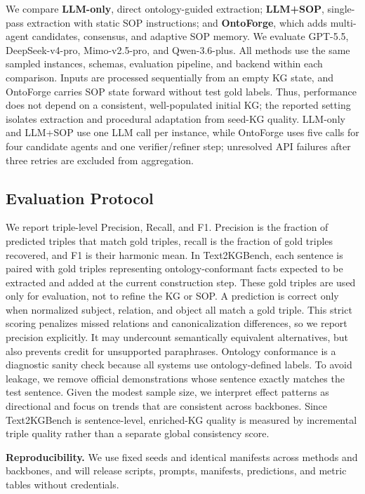 \documentclass[sigconf]{acmart}
\begin{document}
We compare \textbf{LLM-only}, direct ontology-guided extraction; \textbf{LLM+SOP}, single-pass extraction with static SOP instructions; and \textbf{OntoForge}, which adds multi-agent candidates, consensus, and adaptive SOP memory. We evaluate GPT-5.5, DeepSeek-v4-pro, Mimo-v2.5-pro, and Qwen-3.6-plus. All methods use the same sampled instances, schemas, evaluation pipeline, and backend within each comparison. Inputs are processed sequentially from an empty KG state, and OntoForge carries SOP state forward without test gold labels. Thus, performance does not depend on a consistent, well-populated initial KG; the reported setting isolates extraction and procedural adaptation from seed-KG quality. LLM-only and LLM+SOP use one LLM call per instance, while OntoForge uses five calls for four candidate agents and one verifier/refiner step; unresolved API failures after three retries are excluded from aggregation.

\subsection{Evaluation Protocol}

We report triple-level Precision, Recall, and F1. Precision is the fraction of predicted triples that match gold triples, recall is the fraction of gold triples recovered, and F1 is their harmonic mean. In Text2KGBench, each sentence is paired with gold triples representing ontology-conformant facts expected to be extracted and added at the current construction step. These gold triples are used only for evaluation, not to refine the KG or SOP. A prediction is correct only when normalized subject, relation, and object all match a gold triple. This strict scoring penalizes missed relations and canonicalization differences, so we report precision explicitly. It may undercount semantically equivalent alternatives, but also prevents credit for unsupported paraphrases. Ontology conformance is a diagnostic sanity check because all systems use ontology-defined labels. To avoid leakage, we remove official demonstrations whose sentence exactly matches the test sentence. Given the modest sample size, we interpret effect patterns as directional and focus on trends that are consistent across backbones. Since Text2KGBench is sentence-level, enriched-KG quality is measured by incremental triple quality rather than a separate global consistency score.

\textbf{Reproducibility.}
We use fixed seeds and identical manifests across methods and backbones, and will release scripts, prompts, manifests, predictions, and metric tables without credentials.
\end{document}
